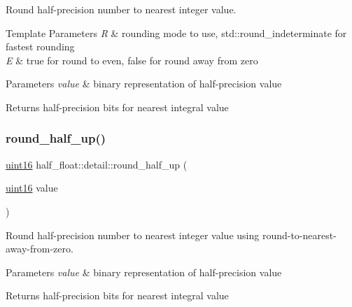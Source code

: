 Round half-\/precision number to nearest integer value. 
\begin{DoxyTemplParams}{Template Parameters}
{\em R} & rounding mode to use, {\ttfamily std\+::round\+\_\+indeterminate} for fastest rounding \\
\hline
{\em E} & {\ttfamily true} for round to even, {\ttfamily false} for round away from zero \\
\hline
\end{DoxyTemplParams}

\begin{DoxyParams}{Parameters}
{\em value} & binary representation of half-\/precision value \\
\hline
\end{DoxyParams}
\begin{DoxyReturn}{Returns}
half-\/precision bits for nearest integral value 
\end{DoxyReturn}
\mbox{\label{namespacehalf__float_1_1detail_ab00a3fec9c3b3d27d5957c85ae5b587b}} 
\subsubsection{\texorpdfstring{round\+\_\+half\+\_\+up()}{round\_half\_up()}}
{\footnotesize\ttfamily \hyperlink{namespacehalf__float_1_1detail_a239ec58092b4e4849b444baee1a01088}{uint16} half\+\_\+float\+::detail\+::round\+\_\+half\+\_\+up (\begin{DoxyParamCaption}\item[{\hyperlink{namespacehalf__float_1_1detail_a239ec58092b4e4849b444baee1a01088}{uint16}}]{value }\end{DoxyParamCaption})\hspace{0.3cm}{\ttfamily [inline]}}

Round half-\/precision number to nearest integer value using round-\/to-\/nearest-\/away-\/from-\/zero. 
\begin{DoxyParams}{Parameters}
{\em value} & binary representation of half-\/precision value \\
\hline
\end{DoxyParams}
\begin{DoxyReturn}{Returns}
half-\/precision bits for nearest integral value 
\end{DoxyReturn}
\mbox{\label{namespacehalf__float_1_1detail_a924a0abc9d3ee7742200574a803a9bfb}} 
